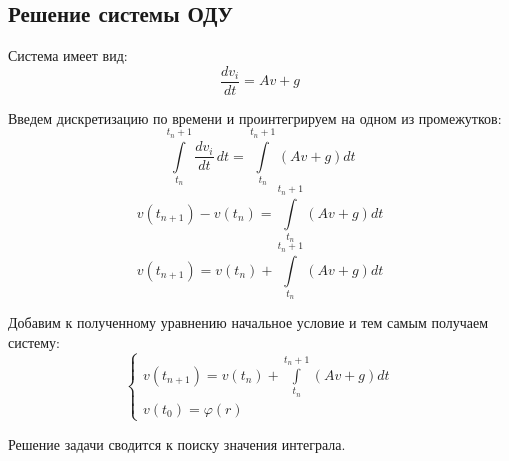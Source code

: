 \subsection{Решение системы ОДУ}

Система имеет вид:
\[
  \frac{d v_i}{dt} = Av + g
\]

Введем дискретизацию по времени и проинтегрируем на одном из промежутков:
\[
  \int\limits_{t_{n}}^{t_n+1} \frac{d v_i}{dt} \,dt = \int\limits_{t_{n}}^{t_n+1} (Av + g) dt
\]
\[
  v(t_{n+1}) - v(t_n) = \int\limits_{t_{n}}^{t_n+1} (Av + g) dt
\]
\[
  v(t_{n+1}) = v(t_n) + \int\limits_{t_{n}}^{t_n+1} (Av + g) dt
\]

Добавим к полученному уравнению начальное условие и тем самым получаем систему:
\[
  \begin{cases}
    v(t_{n+1}) = v(t_n) + \int\limits_{t_{n}}^{t_n+1} (Av + g) dt \\
    v(t_0) = \varphi(r)
  \end{cases}
\]

Решение задачи сводится к поиску значения интеграла.